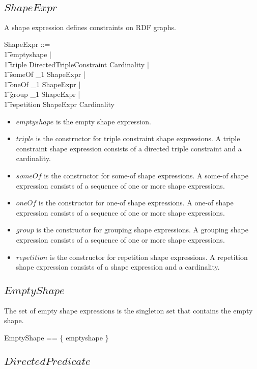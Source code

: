 \documentclass{article}
\begin{document}
\subsection{$ShapeExpr$}
A shape expression defines constraints on RDF graphs.
\begin{zed}
	ShapeExpr ::= \\
\t1		emptyshape | \\
\t1		triple \ldata DirectedTripleConstraint \cross Cardinality \rdata | \\
\t1		someOf \ldata \seq_1 ShapeExpr \rdata | \\
\t1		oneOf \ldata \seq_1 ShapeExpr \rdata | \\
\t1		group \ldata \seq_1 ShapeExpr \rdata | \\
\t1		repetition \ldata ShapeExpr \cross Cardinality \rdata
\end{zed}
\begin{itemize}
\item $emptyshape$ is the empty shape expression.
\item $triple$ is the constructor for triple constraint shape expressions. 
A triple constraint shape expression consists of a directed triple constraint and a cardinality.
\item $someOf$ is the constructor for some-of shape expressions.
A some-of shape expression consists of a sequence of one or more shape expressions.
\item $oneOf$ is the constructor for one-of shape expressions.
A one-of shape expression consists of a sequence of one or more shape expressions.
\item $group$ is the constructor for grouping shape expressions.
A grouping shape expression consists of a sequence of one or more shape expressions.
\item $repetition$ is the constructor for repetition shape expressions.
A repetition shape expression consists of a shape expression and a cardinality.
\end{itemize}

\subsection{$EmptyShape$}
The set of empty shape expressions is the singleton set that contains the empty shape.
\begin{zed}
	EmptyShape == \{ emptyshape \}
\end{zed}

\subsection{$DirectedPredicate$}
\end{document}

